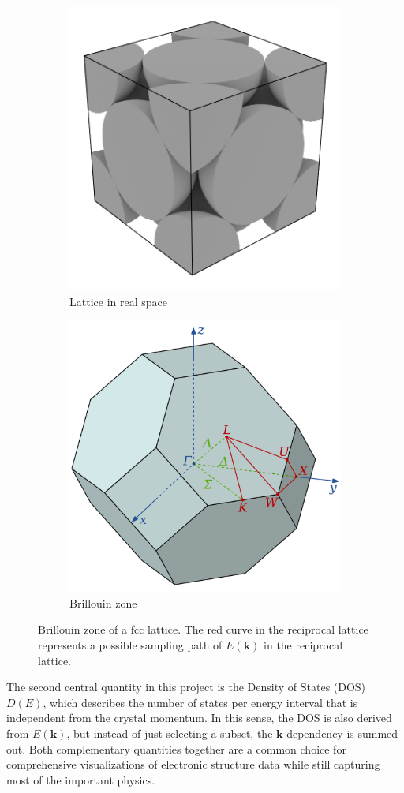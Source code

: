 \begin{figure}[htb!]
    \centering
    \begin{subfigure}{.5\textwidth}
        \centering
        \includegraphics[width=0.5\linewidth]{christian/fcc_real.png}
        \caption{Lattice in real space}
        \label{fig:fcc_real}
    \end{subfigure}%
    \begin{subfigure}{.5\textwidth}
        \centering
        \includegraphics[width=0.5\linewidth]{christian/Brillouin_Zone_(1st,_FCC).png}
        \caption{Brillouin zone}
        \label{fig:fcc_billouin}
    \end{subfigure}
    \caption[Brillouin zone of a fcc lattice]{Brillouin zone of a fcc lattice. The red curve in the reciprocal lattice represents a possible sampling path of $E(\mathbf{k})$ in the reciprocal lattice.}
    \label{fcc}
\end{figure}

The second central quantity in this project is the Density of States (DOS) $D(E)$, which describes the number of states per energy interval that is independent from the crystal momentum. In this sense, the DOS is also derived from $E(\mathbf{k})$, but instead of just selecting a subset, the $\mathbf{k}$ dependency is summed out. Both complementary quantities together are a common choice for comprehensive visualizations of electronic structure data while still capturing most of the important physics. 

